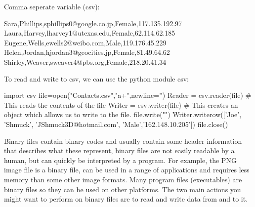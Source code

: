   Comma seperate variable (csv):
  \begin{csv}
Sara,Phillips,sphillips0@google.co.jp,Female,117.135.192.97
Laura,Harvey,lharvey1@utexas.edu,Female,62.114.62.185
Eugene,Wells,ewells2@weibo.com,Male,119.176.45.229
Helen,Jordan,hjordan3@geocities.jp,Female,81.49.64.62
Shirley,Weaver,sweaver4@pbs.org,Female,218.20.41.34 	\end{csv}
  To read and write to csv, we can use the python module csv:
  \begin{python}
import csv
file=open("Contacts.csv","a+",newline='')
Reader = csv.reader(file) # This reads the contents of the file
Writer = csv.writer(file) # This creates an object which allows us to write to the file.
file.write("\n")
Writer.writerow(['Joe', 'Shmuck', 'JShmuck3D@hotmail.com', 'Male','162.148.10.205'])
file.close()	\end{python}
  Binary files contain binary codes and usually contain some header information that describes what these represent, binary files are not easily readable by a human, but can quickly be interpreted by a program. For example, the PNG image file is a binary file, can be used in a range of applications and requires less memory than some other image formats. Many program files (executables) are binary files so they can be used on other platforms. The two main actions you might want to perform on binary files are to read and write data from and to it.
  
